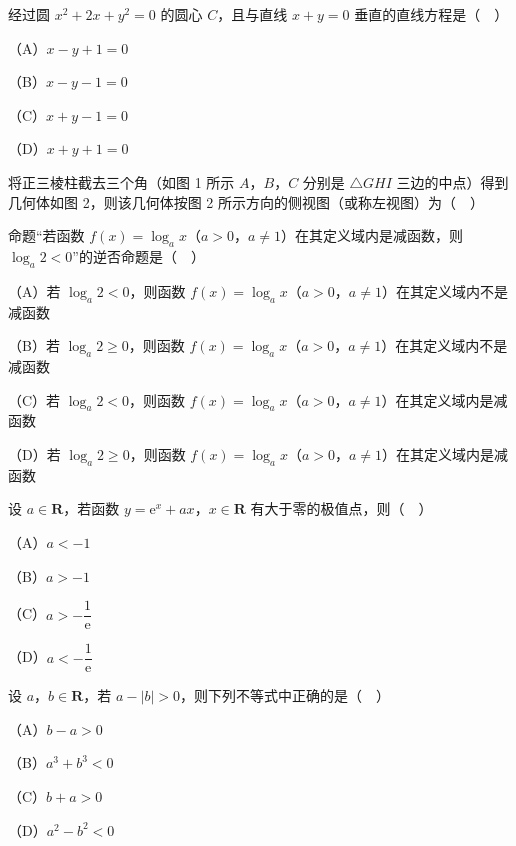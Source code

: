 \begingroup
\renewenvironment{question}{\Needspace{0.5\textheight}}{}
\begin{question}
经过圆 $x^2+2x+y^2=0$ 的圆心 $C$，且与直线 $x+y=0$ 垂直的直线方程是（　）

（A）$x-y+1=0$

（B）$x-y-1=0$

（C）$x+y-1=0$

（D）$x+y+1=0$

\Needspace{0.4\textheight}
\end{question}
\endgroup
\begin{question}
将正三棱柱截去三个角（如图 1 所示 $A$，$B$，$C$ 分别是 $\triangle GHI$ 三边的中点）得到几何体如图 2，则该几何体按图 2 所示方向的侧视图（或称左视图）为（　）
\nopagebreak[4]
\begin{center}\end{center}
\nopagebreak[4]
\end{question}
\begin{question}
命题“若函数 $f(x)=\log_ax$（$a>0$，$a\neq1$）在其定义域内是减函数，则 $\log_a2<0$”的逆否命题是（　）

（A）若 $\log_a2<0$，则函数 $f(x)=\log_ax$（$a>0$，$a\neq1$）在其定义域内不是减函数

（B）若 $\log_a2\geqslant0$，则函数 $f(x)=\log_ax$（$a>0$，$a\neq1$）在其定义域内不是减函数

（C）若 $\log_a2<0$，则函数 $f(x)=\log_ax$（$a>0$，$a\neq1$）在其定义域内是减函数

（D）若 $\log_a2\geqslant0$，则函数 $f(x)=\log_ax$（$a>0$，$a\neq1$）在其定义域内是减函数

\end{question}
\begin{question}
设 $a\in\mathbf R$，若函数 $y=\mathrm e^x+ax$，$x\in\mathbf R$ 有大于零的极值点，则（　）

（A）$a<-1$

（B）$a>-1$

（C）$a>-\dfrac1{\mathrm e}$

（D）$a<-\dfrac1{\mathrm e}$

\end{question}
\begin{question}
设 $a$，$b\in\mathbf R$，若 $a-|b|>0$，则下列不等式中正确的是（　）

（A）$b-a>0$

（B）$a^3+b^3<0$

（C）$b+a>0$

（D）$a^2-b^2<0$

\end{question}

